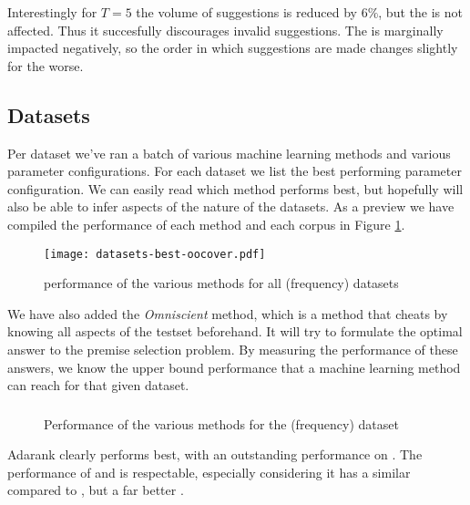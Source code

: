 Interestingly for $T=5$ the volume of suggestions is reduced by $6\%$, but the \oocover is not affected.
Thus it succesfully discourages invalid suggestions.
The \auc is marginally impacted negatively, so the order in which suggestions are made changes slightly for the worse.

\subsection{Datasets}

Per dataset we've ran a batch of various machine learning methods and various parameter configurations.
For each dataset we list the best performing parameter configuration.
We can easily read which method performs best, but hopefully will also be able to infer aspects of the nature of the datasets.
As a preview we have compiled the \oocover performance of each method and each corpus in Figure \ref{fig:best-oocover}.

\begin{figure}[H]
  \centerline{\texttt{[image: datasets-best-oocover.pdf]}}
  \caption{\oocover performance of the various methods for all (frequency) datasets}
  \label{fig:best-oocover}
\end{figure}

We have also added the \emph{Omniscient} method, which is a method that cheats by knowing all aspects of the testset beforehand.
It will try to formulate the optimal answer to the premise selection problem.
By measuring the performance of these answers, we know the upper bound performance that a machine learning method can reach for that given dataset.

\subsubsection{\coq}

\begin{figure}[H]
  \centering
  \caption{Performance of the various methods for the \coq (frequency) dataset}
\end{figure}

Adarank clearly performs best, with an outstanding performance on \auc.
The performance of \nb and \ensemble is respectable,
especially considering it has a similar \auc compared to \adarank,
but a far better \volume.

